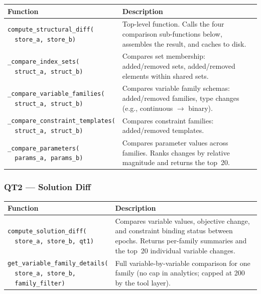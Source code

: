 \documentclass[11pt, a4paper]{article}
\begin{document}
\begin{longtable}{p{5.5cm} p{9cm}}
\toprule
\textbf{Function} & \textbf{Description} \\
\midrule
\texttt{compute\_structural\_diff(\\ ~~store\_a, store\_b)} &
    Top-level function.  Calls the four comparison sub-functions below,
    assembles the result, and caches to disk. \\
\midrule
\texttt{\_compare\_index\_sets(\\ ~~struct\_a, struct\_b)} &
    Compares set membership: added/removed sets, added/removed
    elements within shared sets. \\
\midrule
\texttt{\_compare\_variable\_families(\\ ~~struct\_a, struct\_b)} &
    Compares variable family schemas: added/removed families,
    type changes (e.g., continuous $\to$ binary). \\
\midrule
\texttt{\_compare\_constraint\_templates(\\ ~~struct\_a, struct\_b)} &
    Compares constraint families: added/removed templates. \\
\midrule
\texttt{\_compare\_parameters(\\ ~~params\_a, params\_b)} &
    Compares parameter values across families.  Ranks changes by
    relative magnitude and returns the top~20. \\
\bottomrule
\end{longtable}

\subsubsection{QT2 --- Solution Diff}

\begin{longtable}{p{5.5cm} p{9cm}}
\toprule
\textbf{Function} & \textbf{Description} \\
\midrule
\texttt{compute\_solution\_diff(\\ ~~store\_a, store\_b, qt1)} &
    Compares variable values, objective change, and constraint binding
    status between epochs.  Returns per-family summaries and the
    top~20 individual variable changes. \\
\midrule
\texttt{get\_variable\_family\_details(\\ ~~store\_a, store\_b,\\ ~~family\_filter)} &
    Full variable-by-variable comparison for one family (no cap in
    analytics; capped at 200 by the tool layer). \\
\bottomrule
\end{longtable}
\end{document}
